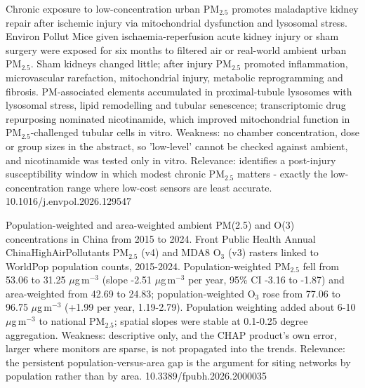 \documentclass[10pt]{article}
\begin{document}
{Chronic exposure to low-concentration urban PM$_{2.5}$ promotes maladaptive kidney repair after ischemic injury via mitochondrial dysfunction and lysosomal stress.}
{Environ Pollut}
{Mice given ischaemia-reperfusion acute kidney injury or sham surgery were exposed for six months to filtered air or real-world ambient urban PM$_{2.5}$. Sham kidneys changed little; after injury PM$_{2.5}$ promoted inflammation, microvascular rarefaction, mitochondrial injury, metabolic reprogramming and fibrosis. PM-associated elements accumulated in proximal-tubule lysosomes with lysosomal stress, lipid remodelling and tubular senescence; transcriptomic drug repurposing nominated nicotinamide, which improved mitochondrial function in PM$_{2.5}$-challenged tubular cells in vitro. Weakness: no chamber concentration, dose or group sizes in the abstract, so 'low-level' cannot be checked against ambient, and nicotinamide was tested only in vitro. Relevance: identifies a post-injury susceptibility window in which modest chronic PM$_{2.5}$ matters - exactly the low-concentration range where low-cost sensors are least accurate.}
{10.1016/j.envpol.2026.129547}

\par{}\baselineskip{}\baselineskip
{}

{Population-weighted and area-weighted ambient PM(2.5) and O(3) concentrations in China from 2015 to 2024.}
{Front Public Health}
{Annual ChinaHighAirPollutants PM$_{2.5}$ (v4) and MDA8 O$_3$ (v3) rasters linked to WorldPop population counts, 2015-2024. Population-weighted PM$_{2.5}$ fell from 53.06 to 31.25 $\mu$g\,m$^{-3}$ (slope -2.51 $\mu$g\,m$^{-3}$ per year, 95\% CI -3.16 to -1.87) and area-weighted from 42.69 to 24.83; population-weighted O$_3$ rose from 77.06 to 96.75 $\mu$g\,m$^{-3}$ (+1.99 per year, 1.19-2.79). Population weighting added about 6-10 $\mu$g\,m$^{-3}$ to national PM$_{2.5}$; spatial slopes were stable at 0.1-0.25 degree aggregation. Weakness: descriptive only, and the CHAP product's own error, larger where monitors are sparse, is not propagated into the trends. Relevance: the persistent population-versus-area gap is the argument for siting networks by population rather than by area.}
{10.3389/fpubh.2026.2000035}
\end{document}
